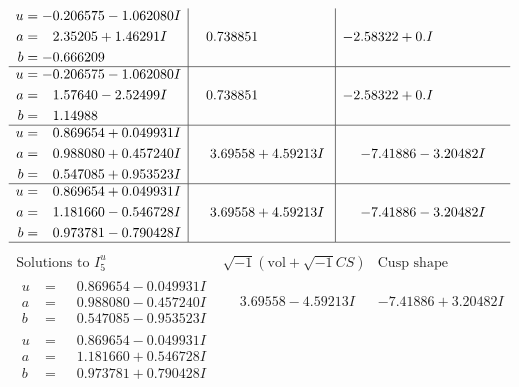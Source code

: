 \documentclass[1p]{elsarticle_modified}
\theoremstyle{definition}
\newcommand{\I}{\sqrt{-1}}
\begin{document}
$$\begin{array}{c|c|c}
\begin{aligned}
u &= -0.206575 - 1.062080 I \\
a &= \phantom{-}2.35205 + 1.46291 I \\
b &= -0.666209\phantom{ +0.000000I}\end{aligned}
 & \phantom{-}0.738851\phantom{ +0.000000I} & -2.58322 + 0. I\phantom{ +0.000000I} \\ \hline\begin{aligned}
u &= -0.206575 - 1.062080 I \\
a &= \phantom{-}1.57640 - 2.52499 I \\
b &= \phantom{-}1.14988\phantom{ +0.000000I}\end{aligned}
 & \phantom{-}0.738851\phantom{ +0.000000I} & -2.58322 + 0. I\phantom{ +0.000000I} \\ \hline\begin{aligned}
u &= \phantom{-}0.869654 + 0.049931 I \\
a &= \phantom{-}0.988080 + 0.457240 I \\
b &= \phantom{-}0.547085 + 0.953523 I\end{aligned}
 & \phantom{-}3.69558 + 4.59213 I & -7.41886 - 3.20482 I \\ \hline\begin{aligned}
u &= \phantom{-}0.869654 + 0.049931 I \\
a &= \phantom{-}1.181660 - 0.546728 I \\
b &= \phantom{-}0.973781 - 0.790428 I\end{aligned}
 & \phantom{-}3.69558 + 4.59213 I & -7.41886 - 3.20482 I\\
 \hline 
 \end{array}$$\newpage$$\begin{array}{c|c|c}  
\text{Solutions to }I^u_{5}& \I (\text{vol} + \sqrt{-1}CS) & \text{Cusp shape}\\
 \hline 
\begin{aligned}
u &= \phantom{-}0.869654 - 0.049931 I \\
a &= \phantom{-}0.988080 - 0.457240 I \\
b &= \phantom{-}0.547085 - 0.953523 I\end{aligned}
 & \phantom{-}3.69558 - 4.59213 I & -7.41886 + 3.20482 I \\ \hline\begin{aligned}
u &= \phantom{-}0.869654 - 0.049931 I \\
a &= \phantom{-}1.181660 + 0.546728 I \\
b &= \phantom{-}0.973781 + 0.790428 I\end{aligned}

\end{array}$$
\end{document}
